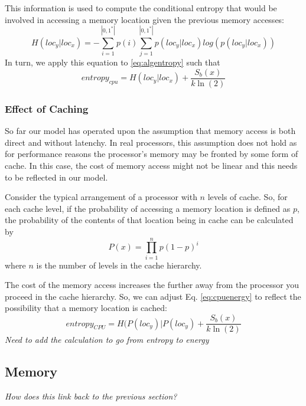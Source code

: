 \documentclass[times, 10pt,onecolumn]{article}
\begin{document}
This information is used to compute the conditional entropy that would be
involved in accessing a memory location given the previous memory accesses:
\begin{equation}
  \label{eq:memoryent}
  H(loc_{y}|loc_{x})=-\sum_{i=1}^{|{0,1}^{*}|}p(i)\sum_{j=1}^{|{0,1}^{*}|}p(loc_{y}|loc_{x})log(p(loc_{y}|loc_{x}))
\end{equation}
In turn, we apply this equation to \ref{eq:algentropy} such that
\begin{equation}
  \label{eq:cpuenergy}
  entropy_{cpu}=H(loc_{y}|loc_{x})+\frac{S_{b}(x)}{k\ln(2)}
\end{equation}

\subsubsection{Effect of Caching}
\label{sec:cache}
So far our model has operated upon the assumption that memory access is
both direct and without latenchy.  In real processors, this assumption
does not hold as for performance reasons the processor's memory may be
fronted by some form of cache.    In this case, the cost of memory
access might not be linear and this needs to be reflected in our model.

Consider the typical arrangement of a processor with $n$ levels of cache. So,
for each cache level, if the probability of accessing a memory location is
defined as $p$, the probability of the contents of that location being in
cache can be calculated by
\begin{equation}
  \label{eq:cacheprob}
  P(x)=\prod_{i=1}^{n}p(1-p)^{i}
\end{equation}
where $n$ is the number of levels in the cache hierarchy.

\label{sec:completemodel}
The cost of the memory access increases the further away from the processor
you proceed in the cache hierarchy.   So, we can adjust
Eq. \ref{eq:cpuenergy} to reflect the possibility that a memory location is
cached:
\begin{equation}
  \label{eq:cacheent}
  entropy_{CPU}=H(P(loc_{y})|P(loc_{y})+\frac{S_{b}(x)}{k\ln(2)}
\end{equation}
\textit{Need to add the calculation to go from entropy to energy}

\subsection{Memory}
\label{sec:memoryenergy}
\textit{How does this link back to the previous section?}
\end{document}
